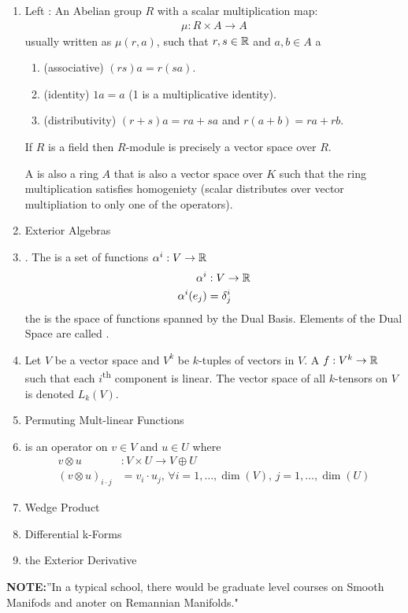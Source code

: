\documentclass[10pt,a4paper]{report}
\begin{document}
\begin{enumerate}
\begin{itemize}
	\end{itemize}
	\item Left : An Abelian group $R$ with a scalar multiplication map:
	\begin{align*}
		\mu : R \times A \to A
	\end{align*}usually written as $\mu(r,a)$, such that $r,s \in \mathbb{R}$ and $a,b \in A$	 a
	\begin{enumerate}[label=(\roman*)]
		\item (associative) $(rs)a = r(sa)$.
		\item (identity) $1a = a$ (1 is a multiplicative identity).
		\item (distributivity) $(r+s)a = ra+sa$ and $r(a+b) = ra+rb$.	
	\end{enumerate}	 If $R$ is a field then $R$-module is precisely a vector space over $R$.
	
	A  is also a ring $A$ that is also a vector space over $K$ such that the ring multiplication satisfies homogeniety (scalar distributes over vector multipliation to only one of the operators).
	\item Exterior Algebras
	\item {}.  The  is a set of functions $\alpha^i: V \to \mathbb{R}$ 
	\begin{align*}
		\alpha^i &: V \to \mathbb{R} \\
			\alpha^i(e_j) &= \delta_j^i
	\end{align*}the  is the space of functions spanned by the Dual Basis. Elements of the Dual Space are called .
	\item {} Let $V$ be a vector space and $V^k$ be $k$-tuples of vectors in $V$. A  $f: V^k \to \mathbb{R}$ such that each $i$\textsuperscript{th} component is linear.  The vector space of all $k$-tensors on $V$ is denoted $L_k(V)$.
	\item Permuting Mult-linear Functions
	\item {} is an operator on $v \in V$ and $u \in U$ where 
	\begin{align*}
		v \otimes u &: V \times U \to V \oplus U \\
		(v \otimes u)_{i\cdot j} &= v_i \cdot u_j,\, \forall i=1,\dots,\dim(V),\, j=1,\dots,\dim(U)
	\end{align*}
	\item Wedge Product
	\item Differential k-Forms
	\item the Exterior Derivative
\end{enumerate}

\noindent\textbf{NOTE:}''In a typical school, there would be graduate level courses on Smooth Manifods and anoter  on Remannian Manifolds."
\end{document}
